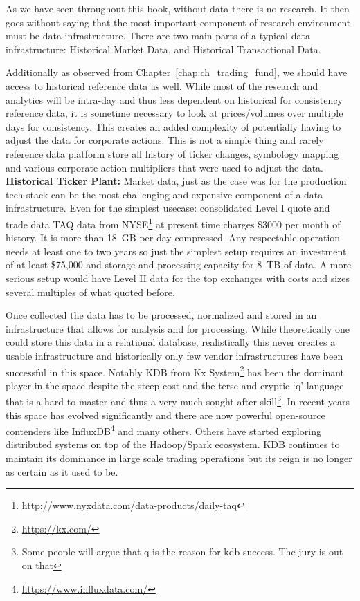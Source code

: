 As we have seen throughout this book, without data there is no research. It then goes without saying that the most important component of research environment must be data infrastructure. There are two main parts of a typical data infrastructure: Historical Market Data, and Historical Transactional Data. 


Additionally as observed from Chapter~\ref{chap:ch_trading_fund}, we should have access to historical reference data as well. While most of the research and analytics will be intra-day and thus less dependent on historical for consistency reference data, it is sometime necessary to look at prices/volumes over multiple days for consistency. This creates an added complexity of potentially having to adjust the data for corporate actions. This is not a simple thing and rarely reference data platform store all history of ticker changes, symbology mapping and various corporate action multipliers that were used to adjust the data. \\



\noindent\textbf{Historical Ticker Plant:} Market data, just as the case was for the production tech stack can be the most challenging and expensive component of a data infrastructure. Even for  the simplest usecase: consolidated Level I quote and trade data TAQ data from NYSE\footnote{\url{http://www.nyxdata.com/data-products/daily-taq}} at present time charges \$3000 per month of history. It is more than 18~GB per day compressed. Any respectable operation needs at least one to two years so just the simplest setup requires an investment of at least \$75,000 and storage and processing capacity for 8~TB of data. A more serious setup would have Level II data for the top exchanges with costs and sizes several multiples  of what quoted before. 


Once collected the data has to be processed, normalized and stored in an infrastructure that allows for analysis and for processing. While theoretically one could store this data in a relational database, realistically this never creates a usable infrastructure and historically only few vendor infrastructures have been successful in this space. Notably KDB from Kx System\footnote{\url{https://kx.com/}} has been the dominant player in the space despite the steep cost and the terse and cryptic `q' language that is a hard to master and thus a very much sought-after skill\footnote{Some people will argue that q is the reason for kdb success. The jury is out on that}. In recent years this space has evolved significantly and there are now powerful open-source contenders like InfluxDB\footnote{\url{https://www.influxdata.com/}} and many others. Others have started exploring distributed systems on top of the Hadoop/Spark ecosystem. KDB continues to maintain its dominance in large scale trading operations but its reign is no longer as certain as it used to be.


